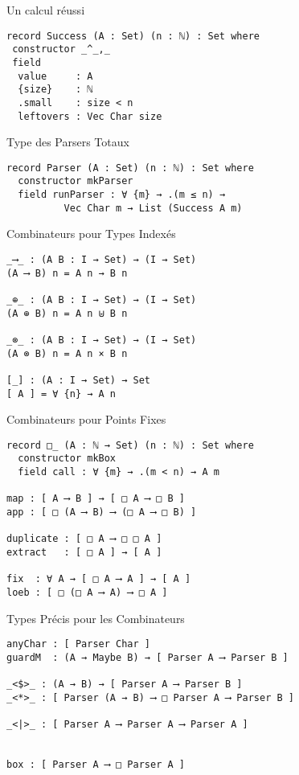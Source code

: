 \documentclass{beamer}
\begin{document}
\begin{frame}[fragile]{Un calcul réussi}
\begin{verbatim}
record Success (A : Set) (n : ℕ) : Set where
 constructor _^_,_
 field
  value     : A
  {size}    : ℕ
  .small    : size < n
  leftovers : Vec Char size
\end{verbatim}
\end{frame}


\begin{frame}[fragile]{Type des Parsers Totaux}
\begin{verbatim}
record Parser (A : Set) (n : ℕ) : Set where
  constructor mkParser
  field runParser : ∀ {m} → .(m ≤ n) →
          Vec Char m → List (Success A m)
\end{verbatim}
\end{frame}

\begin{frame}[fragile]{Combinateurs pour Types Indexés}
\begin{verbatim}
_⟶_ : (A B : I → Set) → (I → Set)
(A ⟶ B) n = A n → B n

_⊕_ : (A B : I → Set) → (I → Set)
(A ⊕ B) n = A n ⊎ B n

_⊗_ : (A B : I → Set) → (I → Set)
(A ⊗ B) n = A n × B n

[_] : (A : I → Set) → Set
[ A ] = ∀ {n} → A n
\end{verbatim}
\end{frame}


\begin{frame}[fragile]{Combinateurs pour Points Fixes}
\begin{verbatim}
record □_ (A : ℕ → Set) (n : ℕ) : Set where
  constructor mkBox
  field call : ∀ {m} → .(m < n) → A m

map : [ A ⟶ B ] → [ □ A ⟶ □ B ]
app : [ □ (A ⟶ B) ⟶ (□ A ⟶ □ B) ]

duplicate : [ □ A ⟶ □ □ A ]
extract   : [ □ A ] → [ A ]

fix  : ∀ A → [ □ A ⟶ A ] → [ A ]
loeb : [ □ (□ A ⟶ A) ⟶ □ A ]
\end{verbatim}
\end{frame}

\begin{frame}[fragile]{Types Précis pour les Combinateurs}
\begin{verbatim}
anyChar : [ Parser Char ]
guardM  : (A → Maybe B) → [ Parser A ⟶ Parser B ]

_<$>_ : (A → B) → [ Parser A ⟶ Parser B ]
_<*>_ : [ Parser (A → B) ⟶ □ Parser A ⟶ Parser B ]

_<|>_ : [ Parser A ⟶ Parser A ⟶ Parser A ]


box : [ Parser A ⟶ □ Parser A ]
\end{verbatim}
\end{frame}
\end{document}
